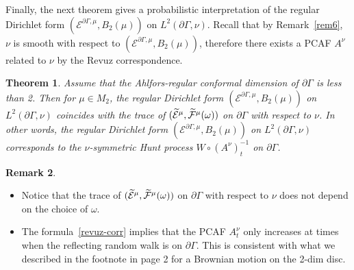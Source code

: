 \documentclass[10pt]{amsart}
\newtheorem{theo}{Theorem}[section]
\theoremstyle{definition}\newtheorem{defi}[theo]{Definition}\newtheorem{rema}[theo]{Remark}\newtheorem{exam}[theo]{Example}\newtheorem{exem}[theo]{Example}\newtheorem{nota}[theo]{Notation}
\newcommand{\ce}{\mathcal{E}}
\newcommand{\cf}{\mathcal{F}}
\let\oldtilde\tilde
\renewcommand*{\tilde}[1]{\mathchoice{\widetilde{#1}}{\widetilde{#1}}{\oldtilde{#1}}{\oldtilde{#1}}}
\begin{document}
Finally, the next theorem gives a probabilistic interpretation of the regular Dirichlet form $(\ce^{\partial\Gamma,\mu},B_2(\mu))$ on $L^2(\partial\Gamma,\nu)$. Recall that by Remark~\ref{rem6}, $\nu$ is smooth with respect to $(\ce^{\partial\Gamma,\mu},B_2(\mu))$, therefore there exists a PCAF $A^{\nu}$ related to $\nu$ by the Revuz correspondence.

\begin{theo}\label{trace}
Assume that the Ahlfors-regular conformal dimension of $\partial\Gamma$ is less than 2. Then for $\mu\in M_2$, the regular Dirichlet form $(\ce^{\partial\Gamma,\mu},B_2(\mu))$ on $L^2(\partial\Gamma,\nu)$ coincides with the trace of $(\tilde\ce^{\mu}, \tilde\cf^{\mu}(\omega))$ on $\partial\Gamma$ with respect to $\nu$. In other words, the regular Dirichlet form $(\ce^{\partial\Gamma,\mu},B_2(\mu))$ on $L^2(\partial\Gamma,\nu)$ corresponds to the $\nu$-symmetric Hunt process $W\circ (A^{\nu})_t^{-1}$ on $\partial\Gamma$.
\end{theo}

\begin{rema}\leavevmode
\begin{itemize}
\item Notice that the trace of $(\tilde\ce^{\mu}, \tilde\cf^{\mu}(\omega))$ on $\partial\Gamma$ with respect to $\nu$ does not depend on the choice of $\omega$.
\item The formula~\eqref{revuz-corr} implies that the PCAF $A^{\nu}_t$ only increases at times when the reflecting random walk is on $\partial\Gamma$. This is consistent with what we described in the footnote in page 2 for a Brownian motion on the 2-dim disc.
\end{itemize}
\end{rema}
\end{document}
